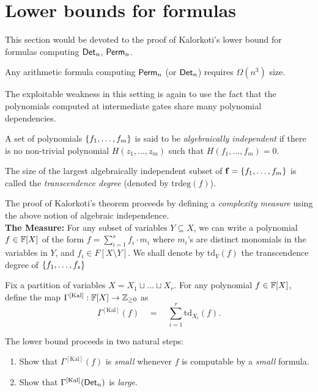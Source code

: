 \documentclass[12pt]{report}
\newcommand{\CM}[1]{\Gamma^{\mathrm{[#1]}}}
\begin{document}
\section{Lower bounds for formulas}\label{sec:Kalorkoti}

This section would be devoted to the proof of Kalorkoti's lower bound
\cite{k85} for formulas computing $\mathsf{Det}_n$, $\mathsf{Perm}_n$.

\begin{theorem}[\cite{k85}]\label{thm:kalorkoti}
  Any arithmetic formula computing $\mathsf{Perm}_n$ (or $\mathsf{Det}_n$) requires
  $\Omega(n^3)$ size.
\end{theorem}

The exploitable weakness in this setting is again to use the fact that the polynomials computed at intermediate gates share many polynomial dependencies. 

\begin{definition}
  A set of polynomials $\left\{f_1,\dots, f_m\right\}$ is said to be
  \emph{algebraically independent} if there is no non-trivial polynomial 
  $H(z_1,\dots, z_m)$ such that $H(f_1,\dots, f_m)=0$. 

  The size of the largest algebraically independent subset of
  $\mathbf{f}=\left\{f_1,\dots, f_m\right\}$ is called the \emph{transcendence
    degree} (denoted by $\mathrm{trdeg}(f)$).
\end{definition}

The proof of Kalorkoti's theorem proceeds by defining a \emph{complexity measure} using the above notion of algebraic independence. \\


{\bf The Measure:} 
For any subset of variables $Y\subseteq X$, we can write a polynomial
$f \in \mathbb{F}[X]$ of the form $f = \sum_{i=1}^s f_i \cdot m_i$ where $m_i$'s are
distinct monomials in the variables in $Y$, and $f_i \in
F[X \setminus Y]$. We shall denote by $\mathrm{td}_Y(f)$ the transcendence degree of $\left\{f_1,\dots, f_s\right\}$


Fix a partition of variables $X = X_1 \sqcup \dots
\sqcup X_r$. For any polynomial $f\in \mathbb{F}[X]$, define the map $\CM{Kal}:\F[X]\rightarrow \Z_{\geq 0}$  as
$$
\CM{Kal}(f) \quad=\quad \sum_{i=1}^r \mathrm{td}_{X_i}(f).
$$

The lower bound proceeds in two natural steps:
\begin{enumerate}
\item Show that $\CM{Kal}(f)$ is \emph{small} whenever $f$ is computable by a \emph{small} formula. 
\item Show that $\CM{Kal}(\Det_n)$ is \emph{large}. 
\end{enumerate}
\end{document}
